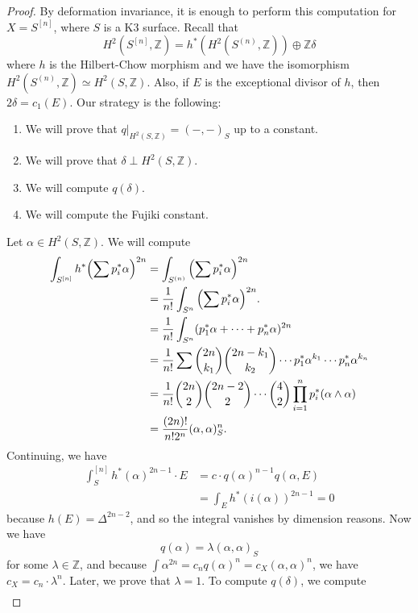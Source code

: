\documentclass[leqno, openany]{memoir}
\theoremstyle{definition}
\theoremstyle{remark}
\theoremstyle{plain}
\theoremstyle{definition}
\theoremstyle{remark}
\newcommand{\Z}{\mathbb{Z}}
\begin{document}
\begin{proof}
    By deformation invariance, it is enough to perform this computation for $X = S^{[n]}$, where $S$ is a K3 surface. Recall that
    \[ H^2(S^{[n]}, \Z) = h^*(H^2(S^{(n)}, \Z)) \oplus \Z \delta \]
    where $h$ is the Hilbert-Chow morphism and we have the isomorphism $H^2(S^{(n)}, \Z) \simeq H^2(S, \Z)$. Also, if $E$ is the exceptional divisor of $h$, then $2 \delta = c_1(E)$. Our strategy is the following:
    \begin{enumerate}
        \item We will prove that $q |_{H^2(S, \Z)} = (-,-)_S$ up to a constant.
        \item We will prove that $\delta \perp H^2(S, \Z)$.
        \item We will compute $q(\delta)$.
        \item We will compute the Fujiki constant.
    \end{enumerate}
    Let $\alpha \in H^2(S, \Z)$. We will compute
    \begin{align*}
        \int_{S^{[n]}} h^* \qty(\sum p_i^* \alpha)^{2n} &= \int_{S^{(n)}} \qty(\sum p_i^* \alpha)^{2n} \\
        &= \frac{1}{n!} \int_{S^n} \qty(\sum p_i^* \alpha)^{2n}. \\
        &= \frac{1}{n!} \int_{S^n} (p_1^* \alpha + \cdots + p_n^* \alpha)^{2n} \\
        &= \frac{1}{n!}\sum \binom{2n}{k_1} \binom{2n-k_1}{k_2} \cdots p_1^* \alpha^{k_1} \cdots p_n^* \alpha^{k_n} \\
        &= \frac{1}{n!} \binom{2n}{2} \binom{2n-2}{2} \cdots \binom{4}{2} \prod_{i=1}^n p_i^*(\alpha \wedge \alpha) \\
        &= \frac{(2n)!}{n!2^n} (\alpha, \alpha)_S^n.
    \end{align*}
    Continuing, we have
    \begin{align*}
        \int_S^{[n]} h^* (\alpha)^{2n-1} \cdot E &= c \cdot q(\alpha)^{n-1} q(\alpha, E) \\
        &= \int_E h^*(i(\alpha))^{2n-1} = 0
    \end{align*}
    because $h(E) = \Delta^{2n-2}$, and so the integral vanishes by dimension reasons. Now we have
    \[ q(\alpha) = \lambda (\alpha, \alpha)_S \]
    for some $\lambda \in \Z$, and because $\int \alpha^{2n} = c_n q(\alpha)^n = c_X (\alpha, \alpha)^n$, we have $c_X = c_n \cdot \lambda^n$. Later, we prove that $\lambda = 1$. To compute $q(\delta)$, we compute
    \begin{align*}

\end{align*}
\end{proof}
\end{document}

